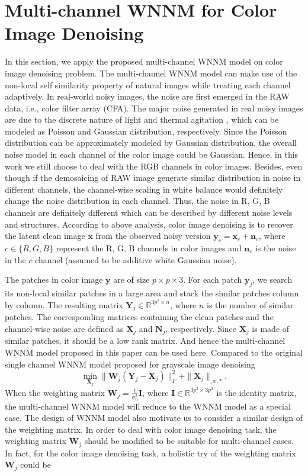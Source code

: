 \documentclass[10pt,twocolumn,letterpaper,sort&compress]{article}
\begin{document}
\section{Multi-channel WNNM for Color Image Denoising}
In this section, we apply the proposed multi-channel WNNM model on color image denoising problem. The multi-channel WNNM model can make use of the non-local self similarity property of natural images while treating each channel adaptively. In real-world noisy images, the noise are first emerged in the RAW data, i.e., color filter array (CFA). The major noise generated in real noisy images are due to the discrete nature of light and thermal agitation \cite{}, which can be modeled as Poisson and Gaussian distribution, respectively. Since the Poisson distribution can be approximately modeled by Gaussian distribution, the overall noise model in each channel of the color image could be Gaussian. Hence, in this work we still choose to deal with the RGB channels in color images. Besides, even though if the demosaicing of RAW image generate similar distribution in noise in different channels, the channel-wise scaling in white balance would definitely change the noise distribution in each channel. Thus, the noise in R, G, B channels are definitely different which can be described by different noise levels and structures. According to above analysis, color image denoising is to recover the latent clean image $\mathbf{x}$ from the observed noisy version $\mathbf{y}_{c}=\mathbf{x}_{c}+\mathbf{n}_{c}$, where $c\in \{R, G, B\}$ represent the R, G, B channels in color images and $\mathbf{n}_{c}$ is the noise in the $c$ channel 
(assumed to be additive white Gaussian noise).

The patches in color image $\mathbf{y}$  are of size $p\times p\times 3$. For each patch $\mathbf{y}_{j}$, we search its non-local similar patches in a large area and stack the similar patches column by column. The resulting matrix $\mathbf{Y}_{j}\in\mathbb{R}^{3p^{2}\times n}$, where $n$ is the number of similar patches. The corresponding matrices containing the clean patches and the channel-wise noise are defined as $\mathbf{X}_{j}$ and $\mathbf{N}_{j}$, respectively. Since $\mathbf{X}_{j}$ is made of similar patches, it should be a low rank matrix. And hence the multi-channel WNNM model proposed in this paper can be used here. Compared to the original single channel WNNM model \cite{wnnm} proposed for grayscale image denoising
\begin{equation}
\min_{\mathbf{X}_{j}}
\|
\mathbf{W}_{j}
(\mathbf{Y}_{j}
-
\mathbf{X}_{j})
\|_{F}^{2}
+
\|
\mathbf{X}_{j}\|_{\bm_{w},*}.
\end{equation}
When the weighting matrix $\mathbf{W}_{j}=\frac{1}{\sigma_{n}^{2}}\mathbf{I}
$, where $\mathbf{I}
\in\mathbb{R}^{3p^{2}\times 3p^{2}}$ is the identity matrix, the multi-channel WNNM model will reduce to the WNNM model as a special case. The design of WNNM model also motivate us to consider a similar design of the weighting matrix. In order to deal with color image denoising task, 
the weighting matrix $\mathbf{W}_{j}$ should be modified to be suitable for multi-channel cases. In fact, for the color image denoising task, a holistic try of the weighting matrix $\mathbf{W}_{j}$ could be 
\end{document}
